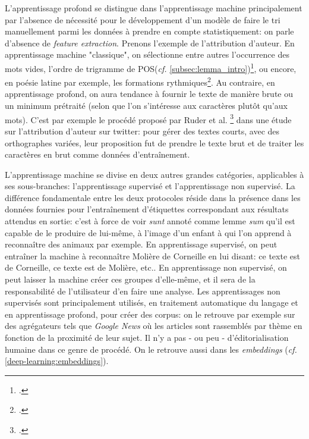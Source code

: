 L'apprentissage profond se distingue dans l'apprentissage machine principalement par l'absence de nécessité pour le développement d'un modèle de faire le tri manuellement parmi les données à prendre en compte statistiquement: on parle d'absence de \textit{feature extraction}. Prenons l'exemple de l'attribution d'auteur. En apprentissage machine "classique", on sélectionne entre autres l'occurrence des mots vides, l'ordre de trigramme de POS(\textit{cf.} \ref{subsec:lemma_intro})\footcite{Cafieroeaax5489}, ou encore, en poésie latine par exemple, les formations rythmiques\footcite{nagy_metre_nodate}. Au contraire, en apprentissage profond, on aura tendance à fournir le texte de manière brute ou un minimum prétraité (selon que l'on s'intéresse aux caractères plutôt qu'aux mots). C'est par exemple le procédé proposé par Ruder et al. \footcite{ruder_character-level_2016} dans une étude sur l'attribution d'auteur sur twitter: pour gérer des textes courts, avec des orthographes variées, leur proposition fut de prendre le texte brut et de traiter les caractères en brut comme données d'entraînement.

L'apprentissage machine se divise en deux autres grandes catégories, applicables à ses sous-branches: l'apprentissage supervisé et l'apprentissage non supervisé.  La différence fondamentale entre les deux protocoles réside dans la présence dans les données fournies pour l'entraînement d'étiquettes correspondant aux résultats attendus en sortie: c'est à force de voir \textit{sunt} annoté comme lemme \textit{sum} qu'il est capable de le produire de lui-même, à l'image d'un enfant à qui l'on apprend à reconnaître des animaux par exemple. En apprentissage supervisé, on peut entraîner la machine à reconnaître Molière de Corneille en lui disant: ce texte est de Corneille, ce texte est de Molière, etc.. En apprentissage non supervisé, on peut laisser la machine créer ces groupes d'elle-même, et il sera de la responsabilité de l'utilisateur d'en faire une analyse. Les apprentissages non supervisés sont principalement utilisés, en traitement automatique du langage et en apprentissage profond, pour créer des corpus: on le retrouve par exemple sur des agrégateurs tels que \textit{Google News} où les articles sont rassemblés par thème en fonction de la proximité de leur sujet. Il n'y a pas - ou peu - d'éditorialisation humaine dans ce genre de procédé. On le retrouve aussi dans les \textit{embeddings} (\textit{cf.} \ref{deep-learning:embeddings}).

